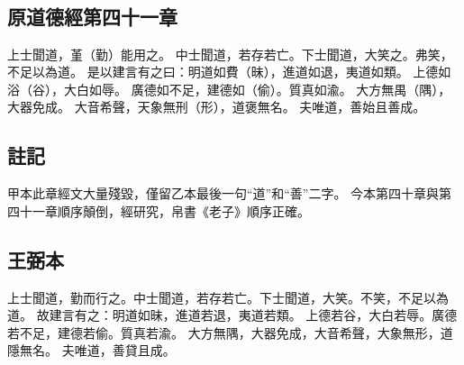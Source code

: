 ﻿%
%

\chapter{~}

\section{原道德經第四十一章}

\begin{withgezhu}

\zhsong


上\textcolor{wangbi-color}{士聞}道，堇（\textcolor{tongjia-color}{勤}）能用之。
中士聞道，若存若亡。下士聞道，大笑之。弗笑，\textcolor{wangbi-color}{不足}以為道。
是以建言有之曰：明道如費（\textcolor{tongjia-color}{昧}），進道如退，夷道如類。
上德如浴（\textcolor{tongjia-color}{谷}），大白如辱。
廣德如不足，建德如（\textcolor{tongjia-color}{偷}）。質\textcolor{wangbi-color}{真如渝}。
大方無禺（\textcolor{tongjia-color}{隅}），大器免成。
大音希聲，天象無刑（\textcolor{tongjia-color}{形}），道褒無名。
\textcolor{wangbi-color}{夫唯}道，善\textcolor{wangbi-color}{始且善成}。

\end{withgezhu}

\section{註記}

\begin{withgezhu}

\zhsong

甲本此章經文大量殘毀，僅留乙本最後一句“道”和“善”二字。
今本第四十章與第四十一章順序顛倒，經研究，帛書《老子》順序正確。

\end{withgezhu}

\section{王弼本}

\begin{withgezhu}

\zhsong

上士聞道，勤而行之。中士聞道，若存若亡。下士聞道，大笑。不笑，不足以為道。
故建言有之：明道如昧，進道若退，夷道若類。
上德若谷，大白若辱。廣德若不足，建德若偷。質真若渝。
大方無隅，大器免成，大音希聲，大象無形，道隱無名。
夫唯道，善貸且成。

\end{withgezhu}
